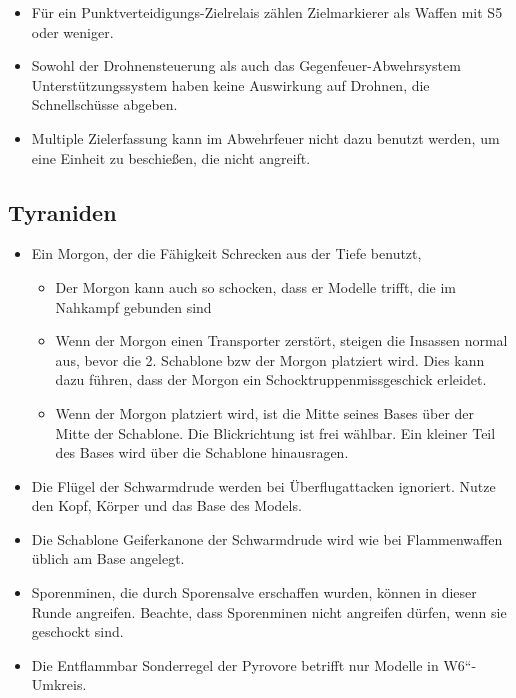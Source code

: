 \begin{itemize}
 \item Für ein Punktverteidigungs-Zielrelais zählen Zielmarkierer als Waffen mit
  S5 oder weniger.

 \item Sowohl der Drohnensteuerung als auch das Gegenfeuer-Abwehrsystem
  Unterstützungssystem haben keine Auswirkung auf Drohnen, die Schnellschüsse
  abgeben.

 \item Multiple Zielerfassung kann im Abwehrfeuer nicht dazu benutzt werden, um
  eine Einheit zu beschießen, die nicht angreift.

\end{itemize}

\subsection{Tyraniden}

\begin{itemize}

 \item Ein Morgon, der die Fähigkeit Schrecken aus der Tiefe benutzt,
\begin{itemize}
 \item Der Morgon kann auch so schocken, dass er Modelle trifft, die im Nahkampf
  gebunden sind
 \item Wenn der Morgon einen Transporter zerstört, steigen die Insassen normal
  aus, bevor die 2. Schablone bzw der Morgon platziert wird. Dies kann dazu
  führen, dass der Morgon ein Schocktruppenmissgeschick erleidet.
 \item Wenn der Morgon platziert wird, ist die Mitte seines Bases über der Mitte
  der Schablone. Die Blickrichtung ist frei wählbar. Ein kleiner Teil des Bases
  wird über die Schablone hinausragen.
\end{itemize}

 \item Die Flügel der Schwarmdrude werden bei Überflugattacken ignoriert. Nutze
  den Kopf, Körper und das Base des Models.

 \item Die Schablone Geiferkanone der Schwarmdrude wird wie bei Flammenwaffen
  üblich am Base angelegt.

 \item Sporenminen, die durch Sporensalve erschaffen wurden, können in dieser
  Runde angreifen. Beachte, dass Sporenminen nicht angreifen dürfen, wenn sie
  geschockt sind.

 \item Die Entflammbar Sonderregel der Pyrovore betrifft nur Modelle in
  W6“-Umkreis.

\end{itemize}

